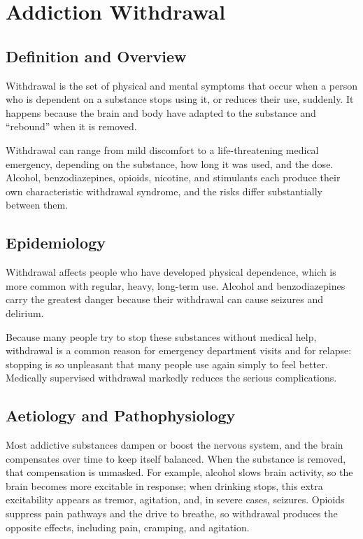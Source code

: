 \chapter{Addiction Withdrawal}

\section*{Definition and Overview}
Withdrawal is the set of physical and mental symptoms that occur when a person who is dependent on a substance stops using it, or reduces their use, suddenly. It happens because the brain and body have adapted to the substance and ``rebound'' when it is removed.

Withdrawal can range from mild discomfort to a life-threatening medical emergency, depending on the substance, how long it was used, and the dose. Alcohol, benzodiazepines, opioids, nicotine, and stimulants each produce their own characteristic withdrawal syndrome, and the risks differ substantially between them.

\section*{Epidemiology}
Withdrawal affects people who have developed physical dependence, which is more common with regular, heavy, long-term use. Alcohol and benzodiazepines carry the greatest danger because their withdrawal can cause seizures and delirium.

Because many people try to stop these substances without medical help, withdrawal is a common reason for emergency department visits and for relapse: stopping is so unpleasant that many people use again simply to feel better. Medically supervised withdrawal markedly reduces the serious complications.

\section*{Aetiology and Pathophysiology}
Most addictive substances dampen or boost the nervous system, and the brain compensates over time to keep itself balanced. When the substance is removed, that compensation is unmasked. For example, alcohol slows brain activity, so the brain becomes more excitable in response; when drinking stops, this extra excitability appears as tremor, agitation, and, in severe cases, seizures. Opioids suppress pain pathways and the drive to breathe, so withdrawal produces the opposite effects, including pain, cramping, and agitation.

